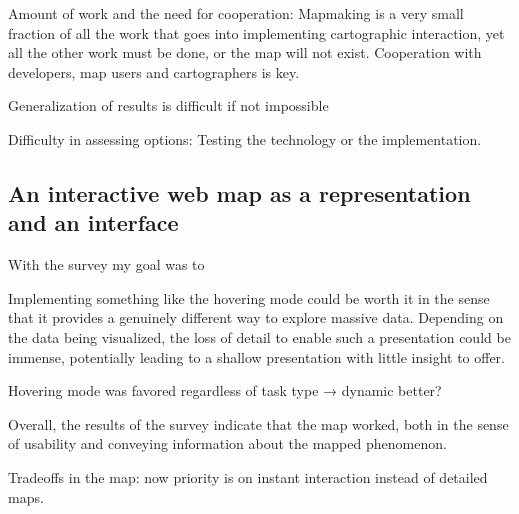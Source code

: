 Amount of work and the need for cooperation:
Mapmaking is a very small fraction of all the work
that goes into implementing cartographic interaction,
yet all the other work must be done,
or the map will not exist.
Cooperation with developers, map users and cartographers is key.


Generalization of results is difficult if not impossible

Difficulty in assessing options: Testing the technology or the implementation.





\subsection{An interactive web map as a representation and an interface}

With the survey my goal was to

Implementing something like the hovering mode could be worth it in the sense
that it provides a genuinely different way to explore massive data.
Depending on the data being visualized,
the loss of detail to enable such a presentation could be immense,
potentially leading to a shallow presentation with little insight to offer.

Hovering mode was favored regardless of task type → dynamic better?
\parencite{but2018}

Overall, the results of the survey indicate that the map worked,
both in the sense of usability and conveying information about the mapped phenomenon.

Tradeoffs in the map:
now priority is on instant interaction instead of detailed maps.

